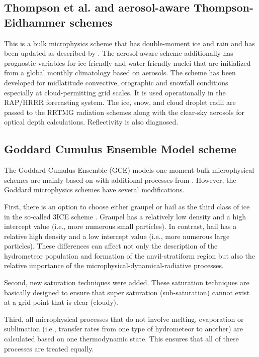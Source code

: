 \subsection{Thompson et al. and aerosol-aware Thompson-Eidhammer schemes}
This is a bulk microphysics scheme that has double-moment ice and rain and has been updated as described by \citet{thompson08}. The aerosol-aware scheme \citep{thompson14}
additionally has prognostic variables for ice-friendly and water-friendly nuclei that are initialized from a global monthly climatology based on aerosols. The scheme has been developed for midlatitude convective, orographic and snowfall conditions especially at cloud-permitting grid scales. It is used operationally in the RAP/HRRR forecasting system. The ice, snow,
and cloud droplet radii are passed to the RRTMG radiation schemes along with the clear-sky aerosols for optical depth calculations. Reflectivity is also diagnosed.

\subsection{Goddard Cumulus Ensemble Model scheme}

The Goddard Cumulus Ensemble (GCE) models \citep{tao93} one-moment bulk microphysical schemes  are mainly based on \citet{lin83} with additional processes from \citet{rutledge84}.  However, the Goddard microphysics schemes have several modifications. 

First, there is an option to choose either graupel or hail as the third class of ice in the so-called 3ICE scheme \citep{mccumber91}.  Graupel has a relatively low density and a high intercept value (i.e., more numerous small particles).  In contrast, hail has a relative high density and a low intercept value (i.e., more numerous large particles).  These differences can affect not only the description of the hydrometeor population and formation of the anvil-stratiform region but also the relative importance of the microphysical-dynamical-radiative processes. 

Second, new saturation techniques \citep{tao89, tao03} were added.  These saturation techniques are basically designed to ensure that super saturation (sub-saturation) cannot exist at a grid point that is clear (cloudy).  

Third, all microphysical processes that do not involve melting, evaporation or sublimation (i.e., transfer rates from one type of hydrometeor to another) are calculated based on one thermodynamic state.  This ensures that all of these processes are treated equally. 


